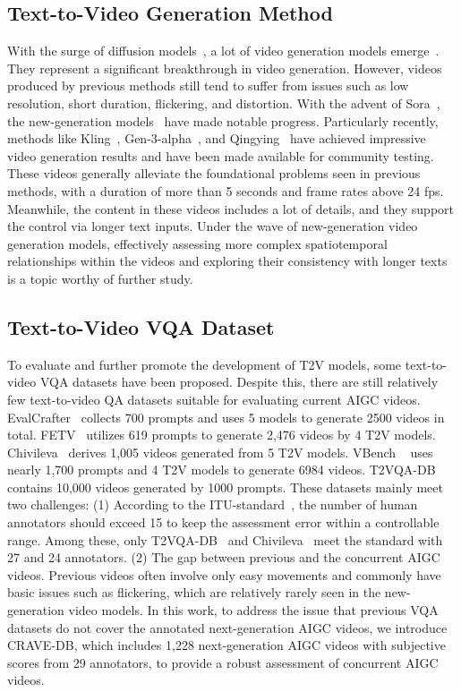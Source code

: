 \subsection{Text-to-Video Generation Method}
With the surge of diffusion models~\cite{stablediffusion,ddpm}, a lot of video generation models emerge~\cite{make-a-video,lavie,modelscope,svd,videocrafter, opensora, opensora-plan}.
They represent a significant breakthrough in video generation. However, videos produced by previous methods still tend to suffer from issues such as low resolution, short duration, flickering, and distortion.
With the advent of Sora~\cite{sora}, the new-generation models~\cite{hunyuan, luma, hailuo,tongyi,pika,cogvideox} have made notable progress. Particularly recently, methods like Kling~\cite{kling}, Gen-3-alpha~\cite{gen3}, and Qingying~\cite{ying} have achieved impressive video generation results and have been made available for community testing.
These videos generally alleviate the foundational problems seen in previous methods, with a duration of more than 5 seconds and frame rates above 24 fps.
Meanwhile, the content in these videos includes a lot of details, and they support the control via longer text inputs.
Under the wave of new-generation video generation models, effectively assessing more complex spatiotemporal relationships within the videos and exploring their consistency with longer texts is a topic worthy of further study.

\subsection{Text-to-Video VQA Dataset}
To evaluate and further promote the development of T2V models, some text-to-video VQA datasets have been proposed. 
Despite this, there are still relatively few text-to-video QA datasets suitable for evaluating current AIGC videos.
EvalCrafter~\cite{evalcrafter} collects 700 prompts and uses 5 models to generate 2500 videos in total.
FETV~\cite{liu2023fetv} utilizes 619 prompts to generate 2,476 videos by 4 T2V models. 
Chivileva~\cite{chivileva2023measuring} derives 1,005 videos generated from 5 T2V models.
VBench ~\cite{huang2023vbench} uses nearly 1,700 prompts and 4 T2V models to generate 6984 videos. 
T2VQA-DB~\cite{kou2024subjectivealigneddatasetmetrictexttovideo} contains 10,000 videos generated by 1000 prompts. 
These datasets mainly meet two challenges:
(1) According to the  ITU-standard~\cite{itu}, the number of human annotators should exceed 15 to keep the assessment error within a controllable range.
Among these, only T2VQA-DB~\cite{kou2024subjectivealigneddatasetmetrictexttovideo} and Chivileva~\cite{chivileva2023measuring} meet the standard with 27 and 24 annotators. 
(2) The gap between previous and the concurrent AIGC videos. Previous videos often involve only easy movements and commonly have basic issues such as flickering, which are relatively rarely seen in the new-generation video models.
In this work, to address the issue that previous VQA datasets do not cover the annotated next-generation AIGC videos, we introduce CRAVE-DB, which includes 1,228 next-generation AIGC videos with subjective scores from 29 annotators, to provide a robust assessment of concurrent AIGC videos.